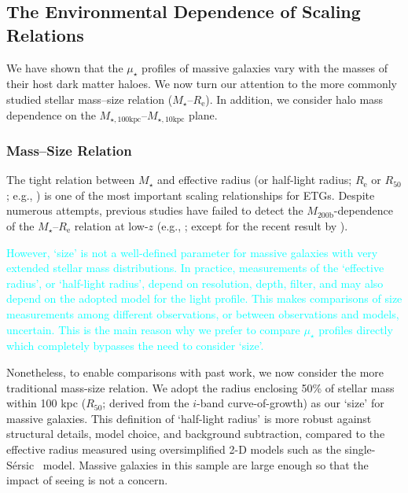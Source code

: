 \documentclass[a4paper,fleqn,usenatbib]{mnras}
\def\ser{{S\'{e}rsic\ }}
\def\mstar{{$M_{\star}$}}
\def\mhalo{{$M_{\mathrm{200b}}$}}
\def\minn{{$M_{\star,10\mathrm{kpc}}$}}
\def\mtot{{$M_{\star,100\mathrm{kpc}}$}}
\def\mden{{$\mu_{\star}$}}
\newcommand{\song}[1]{\textcolor{cyan}{#1}}
\begin{document}

\subsection{The Environmental Dependence of Scaling Relations}
    \label{ssec:scaling}
    
    We have shown that the \mden{} profiles of massive galaxies vary with the masses 
    of their host dark matter haloes. 
    We now turn our attention to the more commonly studied stellar mass--size relation
    (\mstar{}--$R_{\mathrm{e}}$). 
    In addition, we consider halo mass dependence on the \mtot{}--\minn{} plane. 
    
\subsubsection{Mass--Size Relation}
    \label{sssec:mass_size}
    
    The tight relation between \mstar{} and effective radius (or half-light radius; 
    $R_{\mathrm{e}}$ or $R_{\mathrm{50}}$; e.g., \citealt{Shankar2013, Leja2013, 
    vdWel2014}) is one of the most important scaling relationships for ETGs. 
    Despite numerous attempts, previous studies have failed to detect the 
    \mhalo{}-dependence of the \mstar{}--$R_{\mathrm{e}}$ relation at low-$z$ 
    (e.g., \citealt{Weinmann2009, Nair2010, HCompany13, Cerbrian2014}; 
    except for the recent result by \citealt{Yoon2017}). 
    
    \song{
    However, `size' is not a well-defined parameter for massive galaxies with very 
    extended stellar mass distributions. 
    In practice, measurements of the `effective radius', or `half-light radius', depend 
    on resolution, depth, filter, and may also depend on the adopted model for the 
    light profile.  
    This makes comparisons of size measurements among different observations, 
    or between observations and models, uncertain. 
    This is the main reason why we prefer to compare \mden{} profiles directly which 
    completely bypasses the need to consider `size'.
    }
    
    Nonetheless, to enable comparisons with past work, we now consider the more 
    traditional mass-size relation. 
    We adopt the radius enclosing 50\% of stellar mass within 100 kpc 
    ($R_{\mathrm{50}}$; derived from the $i$-band curve-of-growth) as our `size' for 
    massive galaxies. 
    This definition of `half-light radius' is more robust against structural details, 
    model choice, and background subtraction, compared to the effective radius measured 
    using oversimplified 2-D models such as the single-\ser{} model. 
    Massive galaxies in this sample are large enough so that the impact of seeing 
    is not a concern.
    
\end{document}
